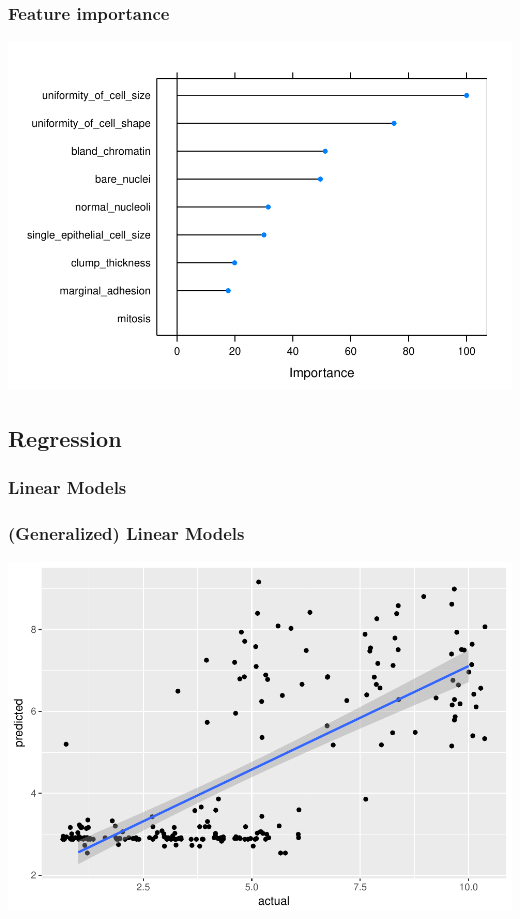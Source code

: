 \documentclass[notes, c, 11pt, xcolor=svgnames, hyperref={colorlinks,citecolor=DeepPink4,linkcolor=DarkRed,urlcolor=DarkBlue}]{beamer}
\begin{document}
\begin{frame}
	\frametitle{Feature importance}
	
	\begin{center}\includegraphics[width=1\textwidth]{webinar_code_files/figure-latex/unnamed-chunk-11-1.pdf} \end{center}
\end{frame}

\subsection{Regression}

\subsubsection{Linear Models}

\begin{frame}
	\frametitle{(Generalized) Linear Models}
	
	\begin{center}\includegraphics[width=1\textwidth]{webinar_code_files/figure-latex/unnamed-chunk-21-1.pdf} \end{center}
\end{frame}
\end{document}
